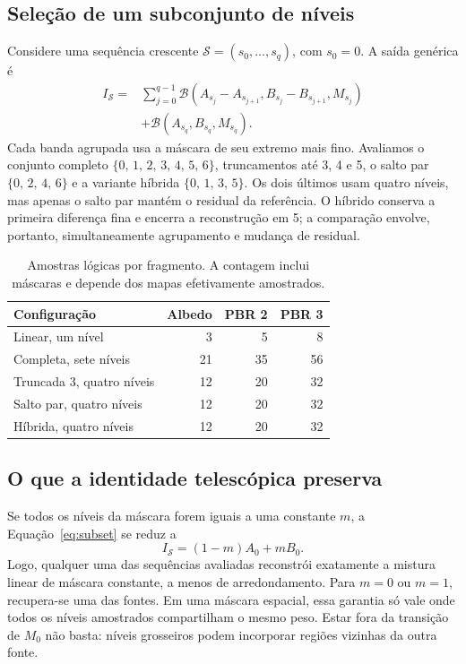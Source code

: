 \subsection{Seleção de um subconjunto de níveis}
Considere uma sequência crescente $\mathcal{S}=(s_0,\ldots,s_q)$, com $s_0=0$. A saída genérica é
\begin{align}
I_{\mathcal S}={}&\sum_{j=0}^{q-1}\mathcal{B}(A_{s_j}-A_{s_{j+1}},
B_{s_j}-B_{s_{j+1}},M_{s_j})\nonumber\\
&+\mathcal{B}(A_{s_q},B_{s_q},M_{s_q}).
\label{eq:subset}
\end{align}
Cada banda agrupada usa a máscara de seu extremo mais fino. Avaliamos o conjunto completo $\{0,\,1,\,2,\,3,\,4,\,5,\,6\}$, truncamentos até 3, 4 e 5, o salto par $\{0,\,2,\,4,\,6\}$ e a variante híbrida $\{0,\,1,\,3,\,5\}$. Os dois últimos usam quatro níveis, mas apenas o salto par mantém o residual da referência. O híbrido conserva a primeira diferença fina e encerra a reconstrução em 5; a comparação envolve, portanto, simultaneamente agrupamento e mudança de residual.

\begin{table}[t]
\centering\small
\caption{Amostras lógicas por fragmento. A contagem inclui máscaras e depende dos mapas efetivamente amostrados.}
\label{tab:cost}
\begin{tabular}{lrrr}\toprule
Configuração & Albedo & PBR 2 & PBR 3\\\midrule
Linear, um nível & 3 & 5 & 8\\
Completa, sete níveis & 21 & 35 & 56\\
Truncada 3, quatro níveis & 12 & 20 & 32\\
Salto par, quatro níveis & 12 & 20 & 32\\
Híbrida, quatro níveis & 12 & 20 & 32\\\bottomrule
\end{tabular}
\end{table}

\subsection{O que a identidade telescópica preserva}
Se todos os níveis da máscara forem iguais a uma constante $m$, a Equação~\ref{eq:subset} se reduz a
\begin{equation}
I_{\mathcal S}=(1-m)A_0+mB_0.
\label{eq:constant}
\end{equation}
Logo, qualquer uma das sequências avaliadas reconstrói exatamente a mistura linear de máscara constante, a menos de arredondamento. Para $m=0$ ou $m=1$, recupera-se uma das fontes. Em uma máscara espacial, essa garantia só vale onde todos os níveis amostrados compartilham o mesmo peso. Estar fora da transição de $M_0$ não basta: níveis grosseiros podem incorporar regiões vizinhas da outra fonte.


